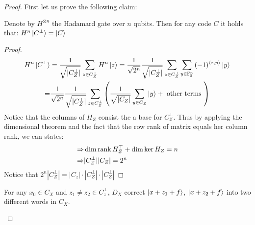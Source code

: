     \newcommand{\GZZZ}[1]{ \frac{1}{\sqrt{|C_{Z}^{\perp}|}} \sum_{z \in C_{Z}^{\perp}}{ #1 } } 
    \newcommand{\GZZZW}[2]{ \frac{1}{\sqrt{|C_{Z}^{\perp}|}} #2 \sum_{z \in C_{Z}^{\perp}}{ #1 } } 
    \newcommand{\GXXX}[1]{ \frac{1}{\sqrt{|C_{Z}|}} \sum_{z \in C_{Z}}{ #1 } } 
    \newcommand{\GXXXW}[2]{ \frac{1}{\sqrt{|C_{Z}|}} #2 \sum_{z \in C_{Z}}{ #1 } } 
    \newcommand{\GXXXV}[2]{ \frac{1}{\sqrt{|C_{Z}|}} \sum_{#2 \in C_{Z}}{ #1 } } 
  \begin{proof}
    First let us prove the following claim: 
    \begin{claim}
      Denote by $H^{\otimes n}$ the Hadamard gate over $n$ qubits. Then for any code $C$ it holds that: $  H^{n}\ket{C^{\perp}} = \ket{C} $
          \end{claim}
    \begin{proof}
      \begin{equation*}
        \begin{split}
        H^{n}\ket{C^{\perp}} &= \GZZZ{ H^{n}\ket{z} } = \frac{1}{ \sqrt{ 2^{n}}} \GZZZ{ \sum_{y\in \mathbb{F}_{2}^{n}}{ (-1)^{\braket{z,y}}  \ket{y}}  }\\
        = & \frac{1}{ \sqrt{ 2^{n}}} \GZZZ{ \left( \GXXXV{ \ket{y} }{y} + \text{ other terms } \right) } 
        \end{split}
       \end{equation*}
       Notice that the columns of $H_{Z}$ consist the a base for $C_{Z}^{\perp}$. Thus by applying the dimensional theorem and the fact that the row rank of matrix equals her column rank, we can states:
       \begin{equation*}
         \begin{split}
          \Rightarrow & \dim \operatorname{rank} H_{Z}^{\top} + \dim \ker H_{Z} = n \\
         \Rightarrow & |C_{Z}^{\perp}||C_{Z}| = 2^{n}
         \end{split}
       \end{equation*}
       Notice that $ 2^{n}|C_{Z}^{\perp}| =  |C_{z}| \cdot |C_{Z}^{\perp}| \cdot |C_{Z}^{\perp}|$ 
    \end{proof}
    \begin{claim}
      For any $x_{0} \in C_{X}$ and $z_{1}\neq z_{2} \in C_{z}^{\perp}$, $D_{X}$ correct $\ket{x+z_{1}+f}$, $\ket{x+z_{2}+f}$ into two different words in $C_{X}$. 

\end{claim}
\end{proof}
